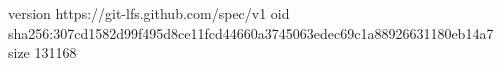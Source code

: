 version https://git-lfs.github.com/spec/v1
oid sha256:307cd1582d99f495d8ce11fcd44660a3745063edec69c1a88926631180eb14a7
size 131168
